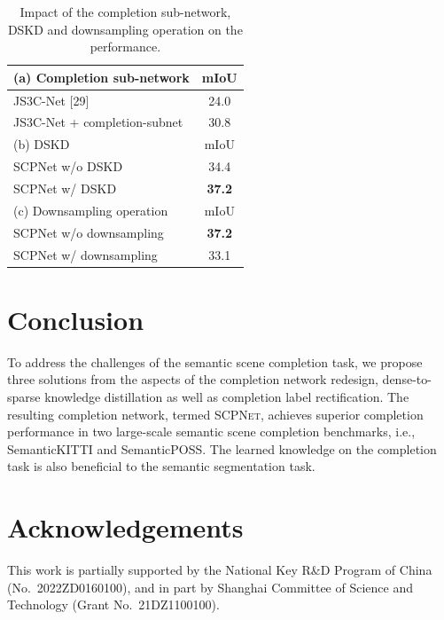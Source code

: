 \documentclass[10pt,twocolumn,letterpaper]{article}
\newcommand{\methodname}{\textsc{SCPNet}}
\begin{document}
\begin{table}[htbp]
\centering
\caption{Impact of the completion sub-network, DSKD and downsampling operation on the performance.}
\label{tab:ablation}
\begin{tabular}{lc}
\toprule
(a) Completion sub-network & mIoU \\
\midrule
JS3C-Net [29]                & 24.0 \\
JS3C-Net + completion-subnet & 30.8 \\
\midrule
(b) DSKD & mIoU \\
\midrule
SCPNet w/o DSKD & 34.4 \\
SCPNet w/ DSKD  & \textbf{37.2} \\
\midrule
(c) Downsampling operation & mIoU \\
\midrule
SCPNet w/o downsampling & \textbf{37.2} \\
SCPNet w/ downsampling  & 33.1 \\
\bottomrule
\end{tabular}
\end{table}


\section{Conclusion}

To address the challenges of the semantic scene completion task, we propose three solutions from the aspects of the completion network redesign, dense-to-sparse knowledge distillation as well as completion label rectification. The resulting completion network, termed \methodname{}, achieves superior completion performance in two large-scale semantic scene completion benchmarks, i.e., SemanticKITTI and SemanticPOSS. The learned knowledge on the completion task is also beneficial to the semantic segmentation task.

\section*{Acknowledgements}

This work is partially supported by the National Key R\&D Program of China (No.\ 2022ZD0160100), and in part by Shanghai Committee of Science and Technology (Grant No.\ 21DZ1100100).

\end{document}

